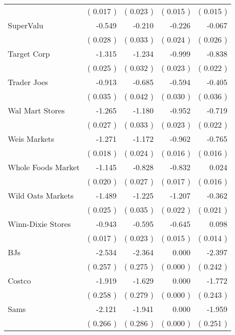 \begin{table}[htbp]
\begin{tabular}{l*{ 4 }{D{.}{.}{-1}}}
& (  0.017 )&(  0.023 )&(  0.015 )&(  0.015 )\\ 
SuperValu  &-0.549 &-0.210 &-0.226 &-0.067 \\ 
& (  0.028 )&(  0.033 )&(  0.024 )&(  0.026 )\\ 
Target Corp &-1.315 &-1.234 &-0.999 &-0.838 \\ 
& (  0.025 )&(  0.032 )&(  0.023 )&(  0.022 )\\ 
Trader Joes  &-0.913 &-0.685 &-0.594 &-0.405 \\ 
& (  0.035 )&(  0.042 )&(  0.030 )&(  0.036 )\\ 
Wal Mart Stores &-1.265 &-1.180 &-0.952 &-0.719 \\ 
& (  0.027 )&(  0.033 )&(  0.023 )&(  0.022 )\\ 
Weis Markets  &-1.271 &-1.172 &-0.962 &-0.765 \\ 
& (  0.018 )&(  0.024 )&(  0.016 )&(  0.016 )\\ 
Whole Foods Market &-1.145 &-0.828 &-0.832 & 0.024 \\ 
& (  0.020 )&(  0.027 )&(  0.017 )&(  0.016 )\\ 
Wild Oats Markets  &-1.489 &-1.225 &-1.207 &-0.362 \\ 
& (  0.025 )&(  0.035 )&(  0.022 )&(  0.021 )\\ 
Winn-Dixie Stores  &-0.943 &-0.595 &-0.645 & 0.098 \\ 
& (  0.017 )&(  0.023 )&(  0.015 )&(  0.014 )\\ 
BJs &-2.534 &-2.364 & 0.000 &-2.397 \\ 
& (  0.257 )&(  0.275 )&(  0.000 )&(  0.242 )\\ 
Costco &-1.919 &-1.629 & 0.000 &-1.772 \\ 
& (  0.258 )&(  0.279 )&(  0.000 )&(  0.243 )\\ 
Sams &-2.121 &-1.941 & 0.000 &-1.959 \\ 
& (  0.266 )&(  0.286 )&(  0.000 )&(  0.251 )\\ 
\midrule\bottomrule\end{tabular}\end{table}